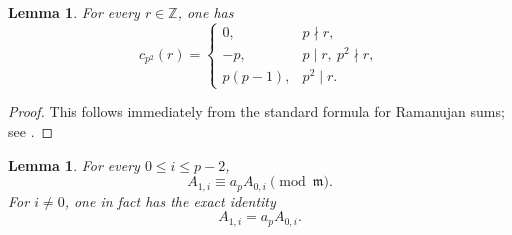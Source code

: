 \documentclass[11pt,table]{amsart}
\newtheorem{lemma}[theorem]{Lemma}
\newcommand{\Z}{\mathbb{Z}}
\numberwithin{equation}{section}
\begin{document}
\begin{lemma}
\label{lem:Ramanujan-p2}
For every \(r\in\Z\), one has
\begin{equation}
\label{eq:ramanujan-p2}
        c_{p^2}(r)
        =
        \begin{cases}
        0,&p\nmid r,\\
        -p,&p\mid r,\ p^2\nmid r,\\
        p(p-1),&p^2\mid r.
        \end{cases}
\end{equation}
\end{lemma}

\begin{proof}
This follows immediately from the standard formula for Ramanujan
sums; see \cite[\S 8.3, Theorem~8.6]{Apostol}.
\end{proof}

\begin{lemma}
\label{lem:A1-A0}
For every \(0\leq i\leq p-2\),
\begin{equation}
\label{eq:A1-A0}
        A_{1,i}
        \equiv
        a_pA_{0,i}
        \pmod{\mathfrak m}.
\end{equation}
For \(i\neq0\), one in fact has the exact identity
\[
        A_{1,i}=a_pA_{0,i}.
\]
\end{lemma}
\end{document}
